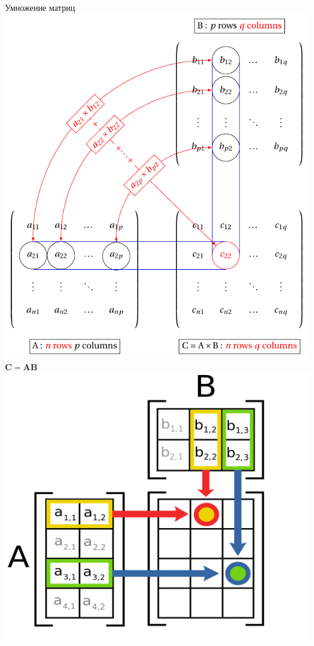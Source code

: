 \documentclass[10pt]{beamer}
\begin{document}
	\begin{frame}{Умножение матриц}
		{
			\includegraphics[width=\textwidth]{../L3/matrix-multiplication.pdf}
		}
		{
			$\mathbf C = \mathbf A \mathbf B$\\
			\includegraphics[width=\textwidth]{../L3/Matrix_multiplication_diagram_2.svg.png}
		}
		
	\end{frame}
	
\end{document}
